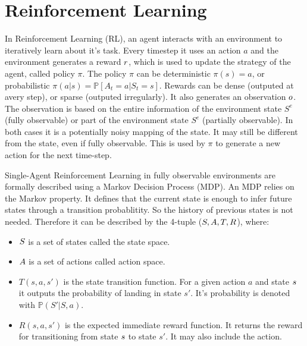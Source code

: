 \section{Reinforcement Learning}

In Reinforcement Learning (RL), an agent interacts with an environment to iteratively learn about it's task. Every timestep it uses an action $a$ and the environment generates a reward $r$, which is used to update the strategy of the agent, called policy $\pi$. The policy $\pi$ can be deterministic $\pi(s) = a$, or probabilistic $\pi(a|s) = \mathbb{P}[A_t=a|S_t=s]$. Rewards can be dense (outputed at avery step), or sparse (outputed irregularly). 
It also generates an observation $o$. The observation is based on the entire information of the environment state $S^e$ (fully observable) or part of the environment state $S^e$ (partially observable). In both cases it is a potentially noisy mapping of the state. It may still be different from the state, even if fully observable. This is used by $\pi$ to generate a new action for the next time-step. \par

Single-Agent Reinforcement Learning in fully observable environments are formally described using a Markov Decision Process (MDP). An MDP relies on the Markov property. It defines that the current state is enough to infer future states through a transition probablitity. So the history of previous states is not needed. Therefore it can be described by the 4-tuple ($S, A, T, R$), where:
\begin{itemize}[noitemsep,nolistsep]
	\item $S$ is a set of states called the state space.
	\item $A$ is a set of actions called action space.
	\item $T(s, a, s')$ is the state transition function. For a given action $a$ and state $s$ it outputs the probability of landing in state $s'$. It's probability is denoted with $\mathbb{P}(S'|S,a)$.
	\item $R(s,a,s')$ is the expected immediate reward function. It returns the reward for transitioning from state $s$ to state $s'$. It may also include the action.
\end{itemize}

